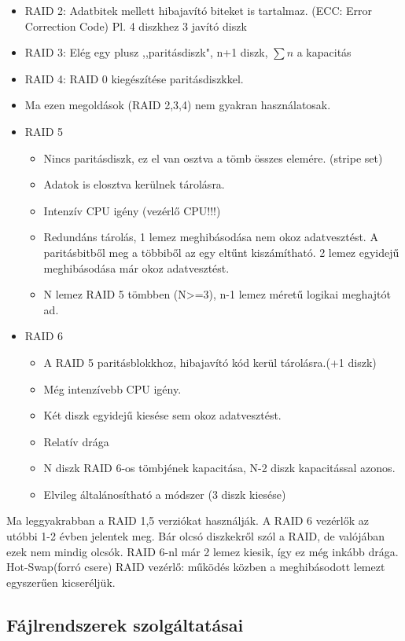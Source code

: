 \documentclass[margin=0px]{article}
\begin{document}
\begin{itemize}
\begin{itemize}
		\end{itemize}
		\item RAID 2: Adatbitek mellett hibajavító biteket is tartalmaz. (ECC: Error Correction Code) Pl. 4 diszkhez 3 javító diszk
		\item RAID 3: Elég egy plusz ,,paritásdiszk", n+1 diszk, $\sum{n}$ a kapacitás
		\item RAID 4: RAID 0 kiegészítése paritásdiszkkel.
		\item Ma ezen megoldások (RAID 2,3,4) nem gyakran használatosak.
		\item RAID 5
		\begin{itemize}
			\item Nincs paritásdiszk, ez el van osztva a tömb összes elemére. (stripe set)
			\item Adatok is elosztva kerülnek tárolásra.
			\item Intenzív CPU igény (vezérlő CPU!!!)
			\item Redundáns tárolás, 1 lemez meghibásodása nem okoz adatvesztést. A paritásbitből meg a többiből az egy eltűnt kiszámítható. 2 lemez egyidejű meghibásodása már okoz adatvesztést.
			\item N lemez RAID 5 tömbben (N>=3), n-1 lemez méretű logikai meghajtót ad.
		\end{itemize}
		\item RAID 6
		\begin{itemize}
			\item A RAID 5 paritásblokkhoz, hibajavító kód kerül tárolásra.(+1 diszk)
			\item Még intenzívebb CPU igény.
			\item Két diszk egyidejű kiesése sem okoz adatvesztést.
			\item Relatív drága
			\item N diszk RAID 6-os tömbjének kapacitása, N-2 diszk kapacitással azonos.
			\item Elvileg általánosítható a módszer (3 diszk kiesése)
		\end{itemize}
	\end{itemize}
	Ma leggyakrabban a RAID 1,5 verziókat használják. A RAID 6 vezérlők az utóbbi 1-2 évben jelentek meg. Bár olcsó diszkekről szól a RAID, de valójában ezek nem mindig olcsók. RAID 6-nl már 2 lemez kiesik, így ez még inkább drága. \\
	Hot-Swap(forró csere) RAID vezérlő: működés közben a meghibásodott lemezt egyszerűen kicseréljük.
	
	\subsection{Fájlrendszerek szolgáltatásai}
	
\end{document}
